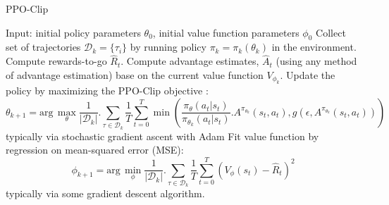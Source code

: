 \documentclass{article}
\begin{document}
\begin{algorithm}[h]
\caption{PPO-Clip}\label{alg:VPG}
\begin{algorithmic}[1]
\State Input: initial policy parameters $\theta_0$, initial value function parameters $\phi_0$
\State Collect set of trajectories $\mathcal{D}_k = \{\tau_i\}$ by running policy $\pi_k = \pi_k(\theta_k)$ in the environment.
\State Compute rewards-to-go $\hat{R}_t$.
\State Compute advantage estimates, $\hat{A}_t$ (using any method of advantage estimation) base on the current value function $V_{\phi_k}$.
\State Update the policy by maximizing the PPO-Clip objective :
$$
\theta_{k+1} = \text{arg}\, \max_{\theta} \frac{1}{|\mathcal{D}_k|}.\sum_{\tau\in\mathcal{D}_k}\frac{1}{T} \sum_{t=0}^{T}\min(\frac{\pi_{\theta}(a_t |s_t)}{\pi_{\theta_k}(a_t |s_t)} .A^{\pi_{\theta_k}}(s_t, a_t), g(\epsilon, A^{\pi_{\theta_k}}(s_t, a_t)))
$$
typically via stochastic gradient ascent with Adam
\State Fit value function by regression on mean-squared error (MSE):
$$
\phi_{k+1} = \text{arg}\, \min_{\phi} \frac{1}{|\mathcal{D}_k|}.\sum_{\tau\in\mathcal{D}_k}\frac{1}{T}\sum_{t=0}^{T}(V_\phi(s_t)-\hat{R}_t)^2
$$
typically via some gradient descent algorithm.
\EndFor
\end{algorithmic}
\end{algorithm}

\newpage 
\end{document}
